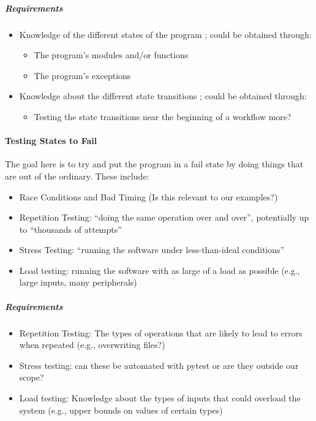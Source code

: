 \subparagraph{Requirements}
\begin{itemize}
      \item Knowledge of the different states of the program
            \cite[p.~82]{patton_software_2006}; could be obtained through:
            \begin{itemize}
                  \item The program's modules and/or functions
                  \item The program's exceptions
            \end{itemize}
      \item Knowledge about the different state transitions
            \cite[p.~82]{patton_software_2006}; could be obtained through:
            \begin{itemize}
                  \item Testing the state transitions near the beginning of a
                        workflow more?
            \end{itemize}
\end{itemize}

\paragraph{Testing States to Fail \cite[p.~84-87]{patton_software_2006}}

The goal here is to try and put the program in a fail state by doing things
that are out of the ordinary. These include:

\begin{itemize}
      \item Race Conditions and Bad Timing \cite[p.~85-86]{patton_software_2006}
            (Is this relevant to our examples?)
      \item Repetition Testing: ``doing the same operation over and over'',
            potentially up to ``thousands of attempts''
            \cite[p.~86]{patton_software_2006}
      \item Stress Testing: ``running the software under less-than-ideal
            conditions'' \cite[p.~86]{patton_software_2006}
      \item Load testing: running the software with as large of a load as
            possible (e.g., large inputs, many peripherals)
            \cite[p.~86]{patton_software_2006}
\end{itemize}

\subparagraph{Requirements}
\begin{itemize}
      \item Repetition Testing: The types of operations that are likely to lead
            to errors when repeated (e.g., overwriting files?)
      \item Stress testing: can these be automated with pytest or are they
            outside our scope? 
      \item Load testing: Knowledge about the types of inputs that could
            overload the system (e.g., upper bounds on values of certain types)
\end{itemize}

